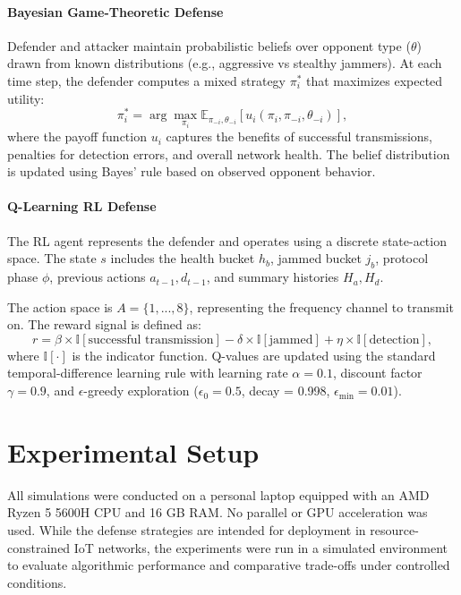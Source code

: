 \documentclass[conference]{IEEEtran}
\begin{document}
\paragraph{Bayesian Game-Theoretic Defense} Defender and attacker maintain probabilistic beliefs over opponent type ($\theta$) drawn from known distributions (e.g., aggressive vs stealthy jammers). At each time step, the defender computes a mixed strategy $\pi_i^*$ that maximizes expected utility:
\[
\pi_i^* = \arg\max_{\pi_i} \mathbb{E}_{\pi_{-i},\theta_{-i}}[u_i(\pi_i,\pi_{-i},\theta_{-i})],
\]
where the payoff function $u_i$ captures the benefits of successful transmissions, penalties for detection errors, and overall network health. The belief distribution is updated using Bayes' rule based on observed opponent behavior.

\paragraph{Q-Learning RL Defense} The RL agent represents the defender and operates using a discrete state-action space. The state $s$ includes the health bucket $h_b$, jammed bucket $j_b$, protocol phase $\phi$, previous actions $a_{t-1}, d_{t-1}$, and summary histories $H_a, H_d$.

The action space is $A = \{1, ..., 8\}$, representing the frequency channel to transmit on. The reward signal is defined as:
\[
r = \beta \times \mathbb{I}[\text{successful transmission}] - \delta \times \mathbb{I}[\text{jammed}] + \eta \times \mathbb{I}[\text{detection}],
\]
where $\mathbb{I}[\cdot]$ is the indicator function. Q-values are updated using the standard temporal-difference learning rule with learning rate $\alpha = 0.1$, discount factor $\gamma = 0.9$, and $\epsilon$-greedy exploration ($\epsilon_0 = 0.5$, decay = 0.998, $\epsilon_{\min} = 0.01$).

\section{Experimental Setup}

All simulations were conducted on a personal laptop equipped with an AMD Ryzen 5 5600H CPU and 16 GB RAM. No parallel or GPU acceleration was used. While the defense strategies are intended for deployment in resource-constrained IoT networks, the experiments were run in a simulated environment to evaluate algorithmic performance and comparative trade-offs under controlled conditions.
\end{document}
